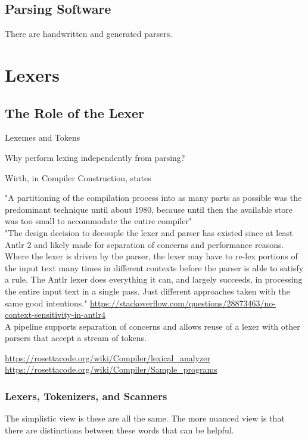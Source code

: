 \documentclass{book}
\begin{document}
\section{Parsing Software}
There are handwritten and generated parsers.

\chapter{Lexers}

\section{The Role of the Lexer}

Lexemes and Tokens

Why perform lexing independently from parsing?

Wirth, in Compiler Construction, states

"A partitioning of the compilation process into as many parts as possible was the predominant
technique until about 1980, because until then the available store was too small to
accommodate the entire compiler"\\



"The design decision to decouple the lexer and parser has existed since at least Antlr 2 and likely made for separation of concerns and performance reasons. Where the lexer is driven by the parser, the lexer may have to re-lex portions of the input text many times in different contexts before the parser is able to satisfy a rule. The Antlr lexer does everything it can, and largely succeeds, in processing the entire input text in a single pass. Just different approaches taken with the same good intentions."
\url{https://stackoverflow.com/questions/28873463/no-context-sensitivity-in-antlr4}\\


A pipeline supports separation of concerns and allows reuse of a lexer
with other parsers that accept a stream of tokens.

\url{https://rosettacode.org/wiki/Compiler/lexical_analyzer}\\
\url{https://rosettacode.org/wiki/Compiler/Sample_programs} 


\subsection{Lexers, Tokenizers, and Scanners}
The simplistic view is these are all the same.
The more nuanced view is that there are distinctions between
these words that can be helpful.
\end{document}
